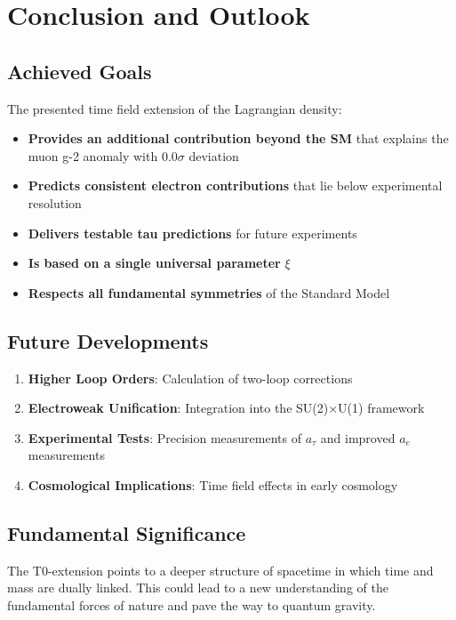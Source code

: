 \documentclass[12pt,a4paper]{article}
\theoremstyle{definition}
\begin{document}
	\section{Conclusion and Outlook}
	
	\subsection{Achieved Goals}
	
	The presented time field extension of the Lagrangian density:
	
	\begin{itemize}
		\item \textbf{Provides an additional contribution beyond the SM} that explains the muon g-2 anomaly with $0.0\sigma$ deviation
		\item \textbf{Predicts consistent electron contributions} that lie below experimental resolution
		\item \textbf{Delivers testable tau predictions} for future experiments
		\item \textbf{Is based on a single universal parameter} $\xi$
		\item \textbf{Respects all fundamental symmetries} of the Standard Model
	\end{itemize}
	
	\subsection{Future Developments}
	
	\begin{enumerate}
		\item \textbf{Higher Loop Orders}: Calculation of two-loop corrections
		\item \textbf{Electroweak Unification}: Integration into the SU(2)×U(1) framework
		\item \textbf{Experimental Tests}: Precision measurements of $a_\tau$ and improved $a_e$ measurements
		\item \textbf{Cosmological Implications}: Time field effects in early cosmology
	\end{enumerate}
	
	\subsection{Fundamental Significance}
	
	The T0-extension points to a deeper structure of spacetime in which time and mass are dually linked. This could lead to a new understanding of the fundamental forces of nature and pave the way to quantum gravity.
	
\end{document}
